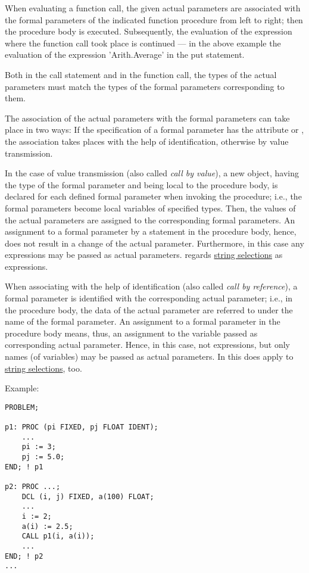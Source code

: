 When evaluating a function call, the given actual parameters are
associated with the formal parameters of the indicated function
procedure 
from left to right;
 then the procedure body is
executed. Subsequently, the evaluation of the expression where the
function call took place is continued --- in the above example the
evaluation of the expression 'Arith.Average' in the put statement.

Both in the call statement and in the function call, the types of the
actual parameters must match the types of the formal parameters
corresponding to them.

The association of the actual parameters with the formal parameters can
take place in two ways: If the specification of a formal parameter has
the attribute  or ,
the association takes places with the
help of identification, otherwise by value transmission.

In the case of value transmission (also called {\em call by value}), a
new object, having the type of the formal parameter and being local to
the procedure body, is declared for each defined formal parameter when
invoking the procedure; i.e., the formal parameters become local
variables of specified types. Then, the values of the actual parameters
are assigned to the corresponding formal parameters. An assignment to a
formal parameter by a statement in the procedure body, hence, does not
result in a change of the actual parameter. Furthermore, in this case
any expressions may be passed as actual parameters.
\OpenPEARL{} regards \hyperlink{StringSelection}{string selections} as
expressions. 

When associating with the help of identification (also called {\em call
by reference}), a formal parameter is identified with the corresponding
actual parameter; i.e., in the procedure body, the data of the actual
parameter are referred to under the name of the formal parameter. An
assignment to a formal parameter in the procedure body means, thus, an
assignment to the variable passed as corresponding actual parameter.
Hence, in this case, not expressions, but only names (of variables) may
be passed as actual parameters. In \OpenPEARL{} this does apply to
\hyperlink{StringSelection}{string selections}, too.
 

Example:

\begin{lstlisting}
PROBLEM;
 
p1: PROC (pi FIXED, pj FLOAT IDENT);
    ... 
    pi := 3;
    pj := 5.0;
END; ! p1

p2: PROC ...;
    DCL (i, j) FIXED, a(100) FLOAT;
    ... 
    i := 2;
    a(i) := 2.5; 
    CALL p1(i, a(i));
    ... 
END; ! p2
... 
\end{lstlisting}

